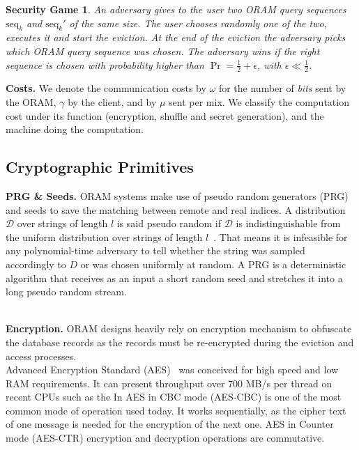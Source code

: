 \documentclass[USenglish,oneside,twocolumn]{article}
\newtheorem*{secgme}{Security Game}
\begin{document}
%
\begin{secgme}
An adversary gives to the user two ORAM query sequences $\text{seq}_k$ and $\text{seq}_k'$ of the same size. The user chooses randomly one of the two, executes it and start the eviction. At the end of the eviction the adversary picks which ORAM query sequence was chosen. The adversary wins if the right sequence is chosen with probability higher than $\Pr = \frac{1}{2}+\epsilon$, with $\epsilon\ll\frac{1}{2}$.
\label{def:Game}
\end{secgme} 
%

\noindent\textbf{Costs.} We denote the communication costs by $\omega$ for the number of \emph{bits} sent by the ORAM, $\gamma$ by the client, and by $\mu$ sent per mix. 
We classify the computation cost under its function (encryption, shuffle and secret generation), and the machine doing the computation. 
%
\subsection{Cryptographic Primitives}
\noindent\textbf{PRG \& Seeds.}
ORAM systems make use of pseudo random generators (PRG) and seeds to save the matching between remote and real indices. A distribution $\mathcal{D}$ over strings of length $l$ is said pseudo random if $\mathcal{D}$ is indistinguishable from the uniform distribution over strings of length $l$~\cite{katz2014introduction}. That means it is infeasible for any polynomial-time adversary to tell whether the string was sampled accordingly to $D$ or was chosen uniformly at random. A PRG is a deterministic algorithm that receives as an input a short random seed and stretches it into a long pseudo random stream.\\\

\noindent\textbf{Encryption.}
ORAM designs heavily rely on encryption mechanism to obfuscate the database records as the records must be re-encrypted during the eviction and access processes.\\
Advanced Encryption Standard (AES)~\cite{daemen2013design} was conceived for high speed and low RAM requirements. It can present throughput over 700 MB/s per thread on recent CPUs such as the In%
AES in CBC mode (AES-CBC) is one of the most common mode of operation used today. It works sequentially, as the cipher text of one message is needed for the encryption of the next one. 
AES in Counter mode (AES-CTR) encryption and decryption operations are commutative.
%
\end{document}

